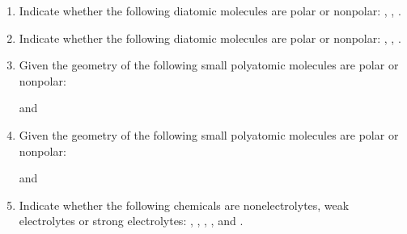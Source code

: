 \documentclass[main.tex]{subfiles}
\begin{document}
\newpage
\begin{fullwidth}

\vspace{0.2cm}{\large \bfseries PostLab questions }
\begin{enumerate}
\item{} Indicate whether the following diatomic molecules are polar or nonpolar: , , .
\vspace{2.5cm}
\item{} Indicate whether the following diatomic molecules are polar or nonpolar: , , .
\vspace{2.5cm}
\item{} Given the geometry of the following small polyatomic molecules are polar or nonpolar:\\
\begin{center} \hspace{.05in}\hspace{.1in} and  \hspace{.1in}\hspace{.07in} \end{center}
\vspace{2.5cm}

\item{} Given the geometry of the following small polyatomic molecules are polar or nonpolar: \\


\begin{center} \hspace{.05in}\hspace{.05in}\hspace{.05in}\hspace{.05in} and \hspace{.05in}\hspace{.05in} \end{center}
\vspace{2.5cm}

\item{} Indicate whether the following chemicals are nonelectrolytes, weak electrolytes or strong electrolytes: , ,  , , and .
\vspace{2.5cm}

\end{enumerate}
\end{fullwidth}
\end{document}
